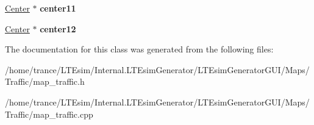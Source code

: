 \begin{DoxyCompactItemize}
\item 
\hyperlink{class_center}{Center} $\ast$ {\bfseries center11}\hypertarget{class_map__traffic_a440b9553c563a3b3f290dbd3e8b6d3eb}{}\label{class_map__traffic_a440b9553c563a3b3f290dbd3e8b6d3eb}

\item 
\hyperlink{class_center}{Center} $\ast$ {\bfseries center12}\hypertarget{class_map__traffic_a80ddd13663f6c579ee4344460471112f}{}\label{class_map__traffic_a80ddd13663f6c579ee4344460471112f}

\end{DoxyCompactItemize}


The documentation for this class was generated from the following files\+:\begin{DoxyCompactItemize}
\item 
/home/trance/\+L\+T\+Esim/\+Internal.\+L\+T\+Esim\+Generator/\+L\+T\+Esim\+Generator\+G\+U\+I/\+Maps/\+Traffic/map\+\_\+traffic.\+h\item 
/home/trance/\+L\+T\+Esim/\+Internal.\+L\+T\+Esim\+Generator/\+L\+T\+Esim\+Generator\+G\+U\+I/\+Maps/\+Traffic/map\+\_\+traffic.\+cpp\end{DoxyCompactItemize}
